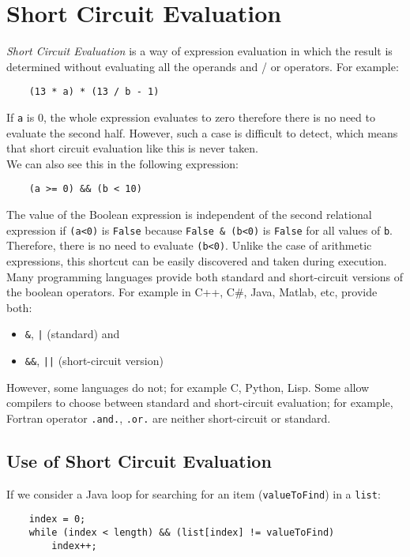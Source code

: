 \section{Short Circuit Evaluation}
\textit{Short Circuit Evaluation} is a way of expression evaluation in which the result is determined without evaluating all the operands and / or operators. For example:
\begin{verbatim}
    (13 * a) * (13 / b - 1)
\end{verbatim}
If \verb|a| is 0, the whole expression evaluates to zero therefore there is no need to evaluate the second half. However, such a case is difficult to detect, which means that short circuit evaluation like this is never taken.\\

We can also see this in the following expression:
\begin{verbatim}
    (a >= 0) && (b < 10)
\end{verbatim}
The value of the Boolean expression is independent of the second relational expression if \verb|(a<0)| is \verb|False| because \verb|False & (b<0)| is \verb|False| for all values of \verb|b|. Therefore, there is no need to evaluate \verb|(b<0)|. Unlike the case of arithmetic expressions, this shortcut can be easily discovered and taken during execution.\\

Many programming languages provide both standard and short-circuit versions of the boolean operators. For example in C++, C\#, Java, Matlab, etc, provide both:
\begin{itemize}
    \item \verb|&|, \verb+|+ (standard) and
    \item \verb|&&|, \verb+||+ (short-circuit version)
\end{itemize}
However, some languages do not; for example C, Python, Lisp. Some allow compilers to choose between standard and short-circuit evaluation; for example, Fortran operator \verb|.and.|, \verb|.or.| are neither short-circuit or standard. 

\subsection{Use of Short Circuit Evaluation}
If we consider a Java loop for searching for an item (\verb|valueToFind|) in a \verb|list|:
\begin{verbatim}
    index = 0;
    while (index < length) && (list[index] != valueToFind)
        index++;
\end{verbatim}

